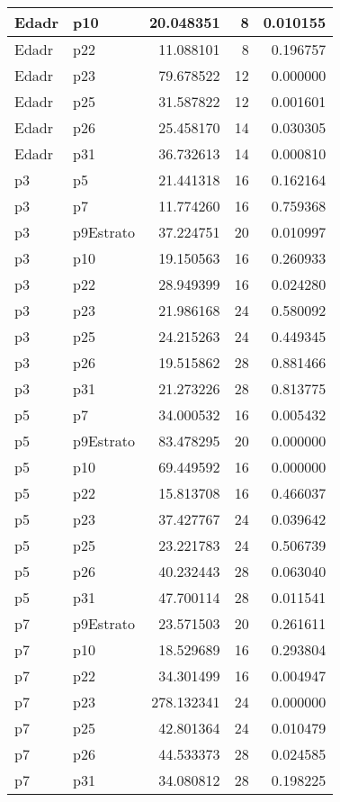 \begin{table}
\begin{tabular}[t]{l|l|r|r|r}
\hline
Edadr & p10 & 20.048351 & 8 & 0.010155\\
\hline
Edadr & p22 & 11.088101 & 8 & 0.196757\\
\hline
Edadr & p23 & 79.678522 & 12 & 0.000000\\
\hline
Edadr & p25 & 31.587822 & 12 & 0.001601\\
\hline
Edadr & p26 & 25.458170 & 14 & 0.030305\\
\hline
Edadr & p31 & 36.732613 & 14 & 0.000810\\
\hline
p3 & p5 & 21.441318 & 16 & 0.162164\\
\hline
p3 & p7 & 11.774260 & 16 & 0.759368\\
\hline
p3 & p9Estrato & 37.224751 & 20 & 0.010997\\
\hline
p3 & p10 & 19.150563 & 16 & 0.260933\\
\hline
p3 & p22 & 28.949399 & 16 & 0.024280\\
\hline
p3 & p23 & 21.986168 & 24 & 0.580092\\
\hline
p3 & p25 & 24.215263 & 24 & 0.449345\\
\hline
p3 & p26 & 19.515862 & 28 & 0.881466\\
\hline
p3 & p31 & 21.273226 & 28 & 0.813775\\
\hline
p5 & p7 & 34.000532 & 16 & 0.005432\\
\hline
p5 & p9Estrato & 83.478295 & 20 & 0.000000\\
\hline
p5 & p10 & 69.449592 & 16 & 0.000000\\
\hline
p5 & p22 & 15.813708 & 16 & 0.466037\\
\hline
p5 & p23 & 37.427767 & 24 & 0.039642\\
\hline
p5 & p25 & 23.221783 & 24 & 0.506739\\
\hline
p5 & p26 & 40.232443 & 28 & 0.063040\\
\hline
p5 & p31 & 47.700114 & 28 & 0.011541\\
\hline
p7 & p9Estrato & 23.571503 & 20 & 0.261611\\
\hline
p7 & p10 & 18.529689 & 16 & 0.293804\\
\hline
p7 & p22 & 34.301499 & 16 & 0.004947\\
\hline
p7 & p23 & 278.132341 & 24 & 0.000000\\
\hline
p7 & p25 & 42.801364 & 24 & 0.010479\\
\hline
p7 & p26 & 44.533373 & 28 & 0.024585\\
\hline
p7 & p31 & 34.080812 & 28 & 0.198225\\

\end{tabular}
\end{table}
